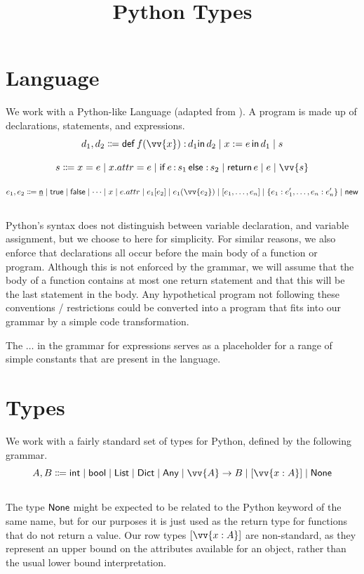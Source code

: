 \documentclass{acmart}
\title{Python Types}
\begin{document}
\section{Language}

We work with a Python-like Language (adapted from
\cite{rak-amnouykit_python_2020}). A program is made up of declarations,
statements, and expressions.\\
\[
  d_1, d_2 \Coloneq \funDecl{f}{\vv{x}}{d_1}{d_2} \mid \varDecl{x}{e}{d_1} \mid
  s
\]

\[
  s \Coloneq x = e \mid x.attr = e \mid \ifStmt{e}{s_1}{s_2} \mid
  \returnStmt e  \mid e \mid \vv{s}
\]

\[
  e_1, e_2 \Coloneq \num{n} \mid \true \mid \false \mid \dots \mid x
  \mid e.attr \mid e_1[e_2] \mid e_1(\vv{e_2}) \mid
  \listExp{e_1, \dots, e_n} \mid \dictExp{e_1: e_1', \dots, e_n:e_n' } \mid
  \newExp
\]
\\
Python's syntax does not distinguish between variable declaration, and variable
assignment, but we choose to here for simplicity. For similar reasons, we also
enforce that declarations all occur before the main body of a function or
program. Although this is not enforced by the grammar, we will assume that the
body of a function contains at most one return statement and that this will be
the last statement in the body. Any hypothetical program not following
these conventions / restrictions could be converted into a program that fits
into our grammar by a simple code transformation.

The \(\dots\) in the grammar for expressions serves as a placeholder for
a range of simple constants that are present in the language.

\section{Types}

We work with a fairly standard set of types for Python, defined by the following
grammar.
\\
\[
  A, B \Coloneq \intty \mid \boolty \mid \listty \mid
  \dictty \mid \anyty \mid \vv{A} \to B \mid [\vv{x:A}] \mid \nonety
\]
\\
The type \(\mathsf{None}\) might be expected to be related to the Python keyword of
the same name, but for our purposes it is just used as the return type for
functions that do not return a value. Our row types \([\vv{x:A}]\) are
non-standard, as they represent an upper bound on the attributes available
for an object, rather than the usual lower bound interpretation.
\end{document}
